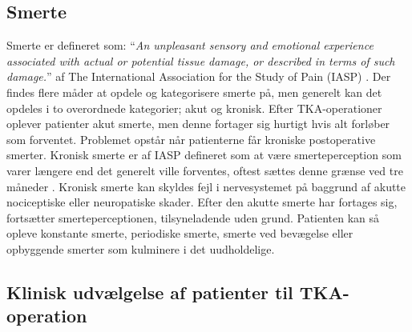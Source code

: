 \subsection{Smerte}

Smerte er defineret som: “\textit{An unpleasant sensory and emotional experience associated with actual or potential tissue damage, or described in terms of such damage.}” af The International Association for the Study of Pain (IASP) \citep{Giangregorio1997} \citep{Carmon}.
Der findes flere måder at opdele og kategorisere smerte på, men generelt kan det opdeles i to overordnede kategorier; akut og kronisk. Efter TKA-operationer oplever patienter akut smerte, men denne fortager sig hurtigt hvis alt forløber som forventet. Problemet opstår når patienterne får kroniske postoperative smerter. Kronisk smerte er af IASP defineret som at være smerteperception som varer længere end det generelt ville forventes, oftest sættes denne grænse ved tre måneder \citep{Carmon}. Kronisk smerte kan skyldes fejl i nervesystemet på baggrund af akutte nociceptiske eller neuropatiske skader. Efter den akutte smerte har fortages sig, fortsætter smerteperceptionen, tilsyneladende uden grund. Patienten kan så opleve konstante smerte, periodiske smerte, smerte ved bevægelse eller opbyggende smerter som kulminere i det uudholdelige. \citep{Giangregorio1997}

\subsection{Klinisk udvælgelse af patienter til TKA-operation}

